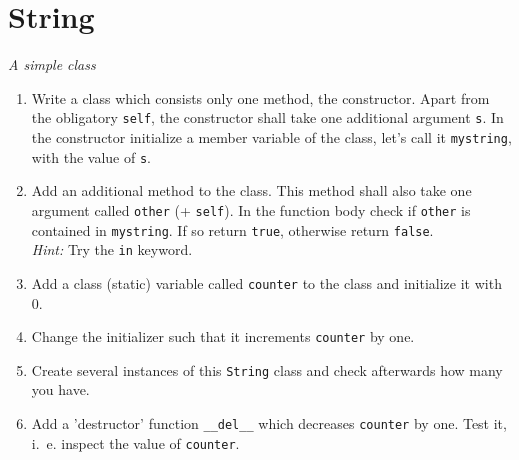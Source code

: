 \documentclass[12pt]{scrartcl}
\begin{document}
\section{String}
\textit{A simple class}
\begin{enumerate}
\item Write a class which consists only one method, the constructor. Apart from the obligatory \texttt{self}, the constructor shall take one additional argument \texttt{s}. In the constructor initialize a member variable of the class, let's call it \texttt{mystring}, with the value of \texttt{s}.
\item Add an additional method to the class. This method shall also take one argument called \texttt{other} (+ \texttt{self}). In the function body check if \texttt{other} is contained in \texttt{mystring}. If so return \texttt{true}, otherwise return \texttt{false}.\\
\textit{Hint:} Try the \texttt{in} keyword.
\item Add a class (static) variable called \texttt{counter} to the class and initialize it with 0.
\item Change the initializer such that it increments \texttt{counter} by one.
\item Create several instances of this \texttt{String} class and check afterwards how many you have.
\item Add a 'destructor' function \texttt{\_\_del\_\_} which decreases
  \texttt{counter} by one. Test it, i.\ e. inspect the value of \texttt{counter}.
\end{enumerate}
\end{document}
